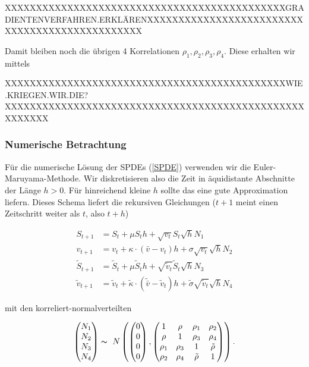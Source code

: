 \documentclass[12pt]{article}
\begin{document}
XXXXXXXXXXXXXXXXXXXXXXXXXXXXXXXXXXXXXXXXXXXXXGRADIENTENVERFAHREN.ERKLÄRENXXXXXXXXXXXXXXXXXXXXXXXXXXXXXXXXXXXXXXXXXXXXXXX

Damit bleiben noch die übrigen 4 Korrelationen $\rho_1, \rho_2, \rho_3,\rho_4$. Diese erhalten wir mittels

XXXXXXXXXXXXXXXXXXXXXXXXXXXXXXXXXXXXXXXXXXXXXWIE.KRIEGEN.WIR.DIE?XXXXXXXXXXXXXXXXXXXXXXXXXXXXXXXXXXXXXXXXXXXXXXXXXXXXXXX


\subsubsection{Numerische Betrachtung}

Für die numerische Lösung der SPDEs (\ref{SPDE}) verwenden wir die Euler-Maruyama-Methode. Wir diskretisieren also die Zeit in äquidistante Abschnitte der Länge $h>0$. Für hinreichend kleine $h$ sollte das eine gute Approximation liefern. Dieses Schema liefert die rekursiven Gleichungen ($t+1$ meint einen Zeitschritt weiter als $t$, also $t+h$)

\begin{align} \label{EMSPDE}
S_{t+1} &= S_t +\mu S_t h + \sqrt{v_t} S_t \sqrt{h} N_1 \\
v_{t+1} &= v_t +\kappa\cdot(\bar{v}-v_t) h + \sigma\sqrt{v_t}\sqrt{h} N_2\\
\tilde{S}_{t+1} &= \tilde{S}_t +\mu \tilde{S}_t h + \sqrt{\tilde{v}_t} \tilde{S}_t \sqrt{h} N_3 \\
\tilde{v}_{t+1} &= \tilde{v}_t +\tilde{\kappa}\cdot(\tilde{\bar{v}}-\tilde{v}_t) h + \tilde{\sigma}\sqrt{\tilde{v}_t}\sqrt{h} N_4
\end{align}

mit den korreliert-normalverteilten

\begin{align*}
\left(\begin{matrix}
N_1\\N_2\\N_3\\N_4
\end{matrix}\right)
\thicksim \
N\left(
\left(\begin{matrix}
0\\0\\0\\0
\end{matrix}\right),
\left(\begin{matrix}
1& \rho& \rho_1& \rho_2\\
\rho& 1& \rho_3& \rho_4\\
\rho_1& \rho_3& 1& \tilde{\rho}\\
\rho_2& \rho_4& \tilde{\rho}& 1
\end{matrix}\right)
\right).
\end{align*}
\end{document}
